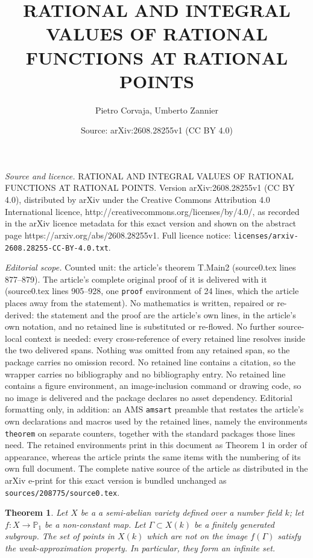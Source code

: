 \documentclass[10pt,a4paper]{amsart}
\title{\uppercase{Rational and integral values of rational functions at rational points}}
\author{Pietro Corvaja, Umberto Zannier}
\date{Source: arXiv:2608.28255v1 (CC BY 4.0)}
\newtheorem{theorem}{Theorem}
\def\P{{{\mathbb P}}}
\begin{document}
\maketitle

\noindent\emph{Source and licence.} \uppercase{Rational and integral values of rational functions at rational points}. Version arXiv:2608.28255v1 (CC BY 4.0), distributed by arXiv under the Creative Commons Attribution 4.0 International licence, http://creativecommons.org/licenses/by/4.0/, as recorded in the arXiv licence metadata for this exact version and shown on the abstract page https://arxiv.org/abs/2608.28255v1. Full licence notice: \texttt{licenses/arxiv-2608.28255-CC-BY-4.0.txt}.\par\smallskip

\noindent\textit{Editorial scope.} Counted unit: the article's theorem T.Main2 (source0.tex lines 877--879). The article's complete original proof of it is delivered with it (source0.tex lines 905--928, one \texttt{proof} environment of 24 lines, which the article places away from the statement). No mathematics is written, repaired or re-derived: the statement and the proof are the article's own lines, in the article's own notation, and no retained line is substituted or re-flowed.  No further source-local context is needed: every cross-reference of every retained line resolves inside the two delivered spans.  Nothing was omitted from any retained span, so the package carries no omission record.  No retained line contains a citation, so the wrapper carries no bibliography and no bibliography entry.  No retained line contains a figure environment, an image-inclusion command or drawing code, so no image is delivered and the package declares no asset dependency.  Editorial formatting only, in addition: an AMS \texttt{amsart} preamble that restates the article's own declarations and macros used by the retained lines, namely the environments \texttt{theorem} on separate counters, together with the standard packages those lines need.  The retained environments print in this document as Theorem 1 in order of appearance, whereas the article prints the same items with the numbering of its own full document.  The complete native source of the article as distributed in the arXiv e-print for this exact version is bundled unchanged as \texttt{sources/208775/source0.tex}.
\begin{theorem}\label{T.Main2}
Let $X$ be a a semi-abelian variety defined over a number field $k$; let $f:X\to \P_1$ be a non-constant map. Let $\Gamma\subset X(k)$ be a finitely generated subgroup. The set of points in $X(k)$ which are not on the image $f(\Gamma)$ satisfy the weak-approximation property. In particular, they form an infinite set.  
\end{theorem}
\end{document}
